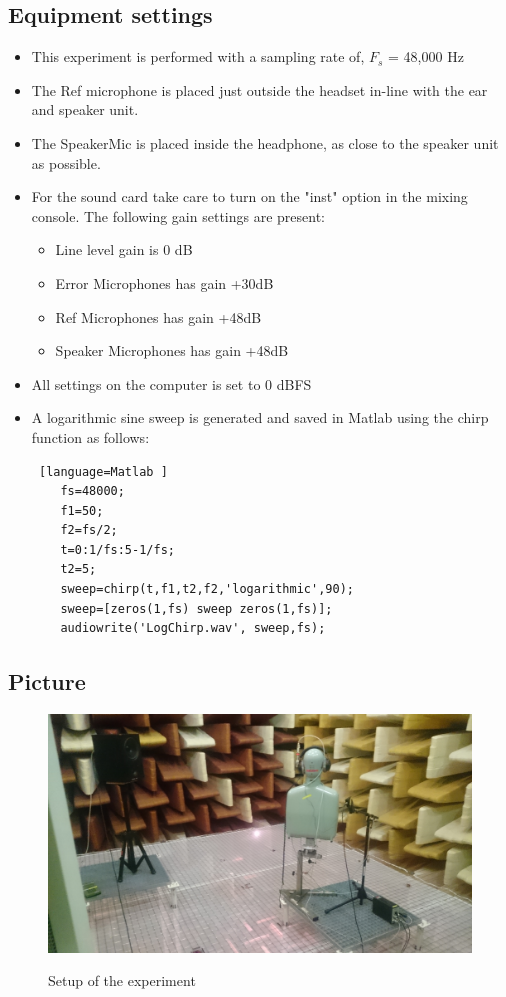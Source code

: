 \subsection{Equipment settings}
\begin{itemize}
	\item This experiment is performed with a sampling rate of, $F_{s}$ = 48,000 Hz
	\item The Ref microphone is placed just outside the headset in-line with the ear and speaker unit. 
	\item The SpeakerMic is placed inside the headphone, as close to the speaker unit as possible. 
	\item For the sound card take care to turn on the "inst" option in the mixing console. The following gain settings are present: 		
	\begin{itemize}
		\item Line level gain is 0 dB
		\item Error Microphones has gain +30dB
		\item Ref Microphones has gain +48dB
		\item Speaker Microphones has gain +48dB
	\end{itemize}
	\item All settings on the computer is set to 0 dBFS
	\item A logarithmic sine sweep is generated and saved in Matlab using the chirp function as follows:
	\begin{lstlisting} [language=Matlab	]
	fs=48000;
	f1=50;
	f2=fs/2;
	t=0:1/fs:5-1/fs;
	t2=5;
	sweep=chirp(t,f1,t2,f2,'logarithmic',90);
	sweep=[zeros(1,fs) sweep zeros(1,fs)];
	audiowrite('LogChirp.wav', sweep,fs);
	\end{lstlisting}
\end{itemize}

\subsection{Picture}
\begin{figure}[H]
	\includegraphics[width=\textwidth]{../Journal/Experiments/AngleOfIncidence/AngInSetup.jpg}
	\label{AngIncidenceSetup}	
	\caption{Setup of the experiment}
\end{figure}


